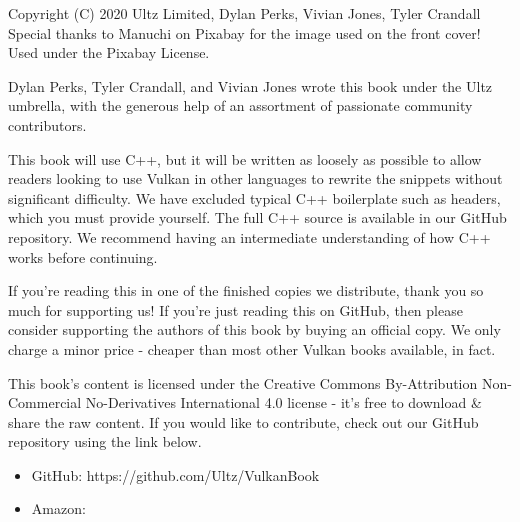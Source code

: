 Copyright (C) 2020 Ultz Limited, Dylan Perks, Vivian Jones, Tyler Crandall
Special thanks to Manuchi on Pixabay for the image used on the front cover! Used under the Pixabay License.

Dylan Perks, Tyler Crandall, and Vivian Jones wrote this book under the Ultz umbrella, with the generous help of an assortment of passionate community contributors.

This book will use C++, but it will be written as loosely as possible to allow readers looking to use Vulkan in other languages to rewrite the snippets without significant difficulty. We have excluded typical C++ boilerplate such as headers, which you must provide yourself. The full C++ source is available in our GitHub repository. We recommend having an intermediate understanding of how C++ works before continuing.

If you're reading this in one of the finished copies we distribute, thank you so much for supporting us! If you're just reading this on GitHub, then please consider supporting the authors of this book by buying an official copy. We only charge a minor price - cheaper than most other Vulkan books available, in fact.

This book's content is licensed under the Creative Commons By-Attribution Non-Commercial No-Derivatives International 4.0 license - it's free to download \& share the raw content. If you would like to contribute, check out our GitHub repository using the link below.

\begin{itemize}
\itemsep1pt\parskip0pt
\item
  GitHub: https://github.com/Ultz/VulkanBook
\item
  Amazon: 
\end{itemize}
\newpage